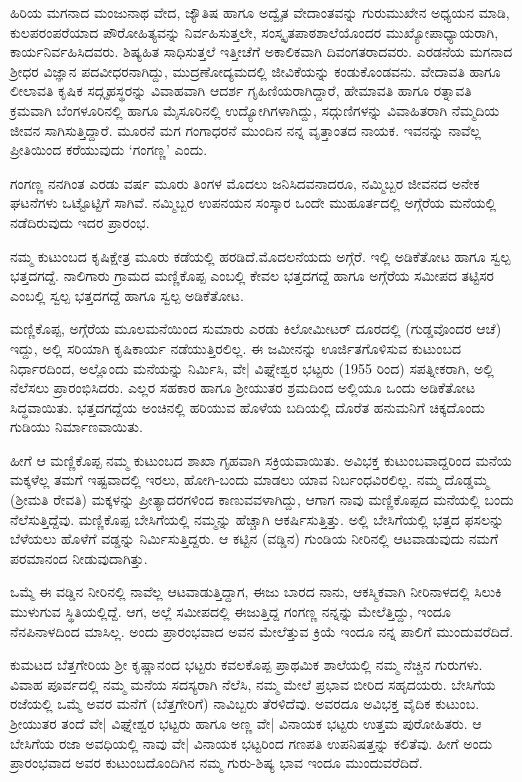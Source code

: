 ಹಿರಿಯ ಮಗನಾದ ಮಂಜುನಾಥ ವೇದ, ಜ್ಯೌತಿಷ ಹಾಗೂ ಅದ್ವೈತ ವೇದಾಂತವನ್ನು ಗುರುಮುಖೇನ ಅಧ್ಯಯನ ಮಾಡಿ, ಕುಲಪರಂಪರೆಯಾದ ಪೌರೋಹಿತ್ಯವನ್ನು ನಿರ್ವಹಿಸುತ್ತಲೇ, ಸಂಸ್ಕೃತಪಾಠಶಾಲೆಯೊಂದರ ಮುಖ್ಯೋಪಾಧ್ಯಾಯರಾಗಿ, ಕಾರ್ಯನಿರ್ವಹಿಸಿದವರು. ಶಿಷ್ಯಹಿತ ಸಾಧಿಸುತ್ತಲೆ ಇತ್ತೀಚೆಗೆ ಅಕಾಲಿಕವಾಗಿ ದಿವಂಗತರಾದವರು. ಎರಡನೆಯ ಮಗನಾದ ಶ್ರೀಧರ ವಿಜ್ಞಾನ ಪದವೀಧರನಾಗಿದ್ದು, ಮುದ್ರಣೋದ್ಯಮದಲ್ಲಿ ಜೀವಿಕೆಯನ್ನು ಕಂಡುಕೊಂಡವನು. ವೇದಾವತಿ ಹಾಗೂ ಲೀಲಾವತಿ ಕೃಷಿಕ ಸದ್ಗೃಹಸ್ಥರನ್ನು ವಿವಾಹವಾಗಿ ಆದರ್ಶ ಗೃಹಿಣಿಯರಾಗಿದ್ದಾರೆ, ಹೇಮಾವತಿ ಹಾಗೂ ರತ್ನಾವತಿ ಕ್ರಮವಾಗಿ ಬೆಂಗಳೂರಿನಲ್ಲಿ ಹಾಗೂ ಮೈಸೂರಿನಲ್ಲಿ ಉದ್ಯೋಗಿಗಳಾಗಿದ್ದು, ಸದ್ಗುಣಿಗಳನ್ನು ವಿವಾಹಿತರಾಗಿ ನೆಮ್ಮದಿಯ ಜೀವನ ಸಾಗಿಸುತ್ತಿದ್ದಾರೆ. ಮೂರನೆ ಮಗ ಗಂಗಾಧರನೆ ಮುಂದಿನ ನನ್ನ ವೃತ್ತಾಂತದ ನಾಯಕ. ಇವನನ್ನು ನಾವೆಲ್ಲ ಪ್ರೀತಿಯಿಂದ ಕರೆಯುವುದು ‘ಗಂಗಣ್ಣ’ ಎಂದು.

ಗಂಗಣ್ಣ ನನಗಿಂತ ಎರಡು ವರ್ಷ ಮೂರು ತಿಂಗಳ ಮೊದಲು ಜನಿಸಿದವನಾದರೂ, ನಮ್ಮಿಬ್ಬರ ಜೀವನದ ಅನೇಕ ಘಟನೆಗಳು ಒಟ್ಟೊಟ್ಟಿಗೆ ಸಾಗಿವೆ. ನಮ್ಮಿಬ್ಬರ ಉಪನಯನ ಸಂಸ್ಕಾರ ಒಂದೇ ಮುಹೂರ್ತದಲ್ಲಿ ಅಗ್ಗೆರೆಯ ಮನೆಯಲ್ಲಿ ನಡೆದಿರುವುದು ಇದರ ಪ್ರಾರಂಭ.

ನಮ್ಮ ಕುಟುಂಬದ  ಕೃಷಿಕ್ಷೇತ್ರ ಮೂರು ಕಡೆಯಲ್ಲಿ ಹರಡಿದೆ.ಮೊದಲನೆಯದು ಅಗ್ಗೆರೆ. ಇಲ್ಲಿ ಅಡಿಕೆತೋಟ ಹಾಗೂ ಸ್ವಲ್ಪ ಭತ್ತದಗದ್ದೆ. ನಾಲಿಗಾರು ಗ್ರಾಮದ ಮಣ್ಣಿಕೊಪ್ಪ ಎಂಬಲ್ಲಿ ಕೇವಲ ಭತ್ತದಗದ್ದೆ ಹಾಗೂ ಅಗ್ಗೆರೆಯ ಸಮೀಪದ ತಟ್ಟಿಸರ ಎಂಬಲ್ಲಿ ಸ್ವಲ್ಪ ಭತ್ತದಗದ್ದೆ ಹಾಗೂ ಸ್ವಲ್ಪ ಅಡಿಕೆತೋಟ.

ಮಣ್ಣಿಕೊಪ್ಪ, ಅಗ್ಗೆರೆಯ ಮೂಲಮನೆಯಿಂದ ಸುಮಾರು ಎರಡು ಕಿಲೋಮೀಟರ್ ದೂರದಲ್ಲಿ (ಗುಡ್ಡವೊಂದರ ಆಚೆ) ಇದ್ದು, ಅಲ್ಲಿ ಸರಿಯಾಗಿ ಕೃಷಿಕಾರ್ಯ ನಡೆಯುತ್ತಿರಲಿಲ್ಲ. ಈ ಜಮೀನನ್ನು ಊರ್ಜಿತಗೊಳಿಸುವ ಕುಟುಂಬದ ನಿರ್ಧಾರದಿಂದ, ಅಲ್ಲೊಂದು ಮನೆಯನ್ನು ನಿರ್ಮಿಸಿ, ವೇ| ವಿಘ್ನೇಶ್ವರ ಭಟ್ಟರು (1955 ರಿಂದ) ಸಪತ್ನೀಕರಾಗಿ, ಅಲ್ಲಿ ನೆಲೆಸಲು ಪ್ರಾರಂಭಿಸಿದರು. ಎಲ್ಲರ ಸಹಕಾರ ಹಾಗೂ ಶ್ರೀಯುತರ ಶ್ರಮದಿಂದ ಅಲ್ಲಿಯೂ ಒಂದು ಅಡಿಕೆತೋಟ ಸಿದ್ಧವಾಯಿತು. ಭತ್ತದಗದ್ದೆಯ ಅಂಚಿನಲ್ಲಿ ಹರಿಯುವ ಹೊಳೆಯ ಬದಿಯಲ್ಲಿ ದೊರೆತ ಹನುಮನಿಗೆ ಚಿಕ್ಕದೊಂದು  ಗುಡಿಯು ನಿರ್ಮಾಣವಾಯಿತು. 

ಹೀಗೆ ಆ ಮಣ್ಣಿಕೊಪ್ಪ ನಮ್ಮ ಕುಟುಂಬದ ಶಾಖಾ ಗೃಹವಾಗಿ ಸಕ್ರಿಯವಾಯಿತು. ಅವಿಭಕ್ತ ಕುಟುಂಬವಾದ್ದರಿಂದ ಮನೆಯ ಮಕ್ಕಳೆಲ್ಲ ತಮಗೆ ಇಷ್ಟವಾದಲ್ಲಿ ಇರಲು, ಹೋಗಿ-ಬಂದು ಮಾಡಲು ಯಾವ ನಿರ್ಬಂಧವಿರಲಿಲ್ಲ.  ನಮ್ಮ ದೊಡ್ಡಮ್ಮ (ಶ್ರೀಮತಿ ರೇವತಿ) ಮಕ್ಕಳನ್ನು ಪ್ರೀತ್ಯಾದರಗಳಿಂದ ಕಾಣುವವಳಾಗಿದ್ದು, ಆಗಾಗ ನಾವು ಮಣ್ಣಿಕೊಪ್ಪದ ಮನೆಯಲ್ಲಿ ಬಂದು ನೆಲೆಸುತ್ತಿದ್ದೆವು. ಮಣ್ಣಿಕೊಪ್ಪ ಬೇಸಿಗೆಯಲ್ಲಿ ನಮ್ಮನ್ನು ಹೆಚ್ಚಾಗಿ ಆಕರ್ಷಿಸುತ್ತಿತ್ತು. ಅಲ್ಲಿ ಬೇಸಿಗೆಯಲ್ಲಿ ಭತ್ತದ ಫಸಲನ್ನು ಬೆಳೆಯಲು ಹೊಳೆಗೆ ವಡ್ಡನ್ನು ನಿರ್ಮಿಸುತ್ತಿದ್ದರು. ಆ ಕಟ್ಟಿನ (ವಡ್ಡಿನ) ಗುಂಡಿಯ ನೀರಿನಲ್ಲಿ ಆಟವಾಡುವುದು ನಮಗೆ ಪರಮಾನಂದ ನೀಡುವುದಾಗಿತ್ತು.

ಒಮ್ಮೆ ಈ ವಡ್ಡಿನ ನೀರಿನಲ್ಲಿ ನಾವೆಲ್ಲ ಆಟವಾಡುತ್ತಿದ್ದಾಗ, ಈಜು ಬಾರದ ನಾನು, ಆಕಸ್ಮಿಕವಾಗಿ ನೀರಿನಾಳದಲ್ಲಿ ಸಿಲುಕಿ ಮುಳುಗುವ ಸ್ಥಿತಿಯಲ್ಲಿದ್ದೆ. ಆಗ, ಅಲ್ಲೆ ಸಮೀಪದಲ್ಲಿ ಈಜುತ್ತಿದ್ದ ಗಂಗಣ್ಣ ನನ್ನನ್ನು ಮೇಲೆತ್ತಿದ್ದು, ಇಂದೂ ನೆನಪಿನಾಳದಿಂದ ಮಾಸಿಲ್ಲ. ಅಂದು ಪ್ರಾರಂಭವಾದ ಅವನ ಮೇಲೆತ್ತುವ ಕ್ರಿಯೆ ಇಂದೂ ನನ್ನ ಪಾಲಿಗೆ ಮುಂದುವರೆದಿದೆ.

ಕುಮಟದ ಬೆತ್ತಗೇರಿಯ ಶ್ರೀ ಕೃಷ್ಣಾನಂದ ಭಟ್ಟರು ಕವಲಕೊಪ್ಪ ಪ್ರಾಥಮಿಕ ಶಾಲೆಯಲ್ಲಿ ನಮ್ಮ ನೆಚ್ಚಿನ ಗುರುಗಳು. ವಿವಾಹ ಪೂರ್ವದಲ್ಲಿ ನಮ್ಮ ಮನೆಯ ಸದಸ್ಯರಾಗಿ ನೆಲೆಸಿ, ನಮ್ಮ ಮೇಲೆ ಪ್ರಭಾವ ಬೀರಿದ ಸಹೃದಯರು. ಬೇಸಿಗೆಯ ರಜೆಯಲ್ಲಿ ಒಮ್ಮೆ ಅವರ ಮನೆಗೆ (ಬೆತ್ತಗೇರಿಗೆ) ನಾವಿಬ್ಬರು ತೆರಳಿದೆವು. ಅವರದೂ ಅವಿಭಕ್ತ ವೈದಿಕ ಕುಟುಂಬ. ಶ್ರೀಯುತರ ತಂದೆ ವೇ| ವಿಘ್ನೇಶ್ವರ ಭಟ್ಟರು ಹಾಗೂ ಅಣ್ಣ ವೇ| ವಿನಾಯಕ ಭಟ್ಟರು ಉತ್ತಮ ಪುರೋಹಿತರು. ಆ ಬೇಸಿಗೆಯ ರಜಾ ಅವಧಿಯಲ್ಲಿ ನಾವು ವೇ| ವಿನಾಯಕ ಭಟ್ಟರಿಂದ ಗಣಪತಿ ಉಪನಿಷತ್ತನ್ನು ಕಲಿತೆವು. ಹೀಗೆ ಅಂದು ಪ್ರಾರಂಭವಾದ ಅವರ ಕುಟುಂಬದೊಂದಿಗಿನ ನಮ್ಮ ಗುರು-ಶಿಷ್ಯ ಭಾವ ಇಂದೂ ಮುಂದುವರೆದಿದೆ. 

